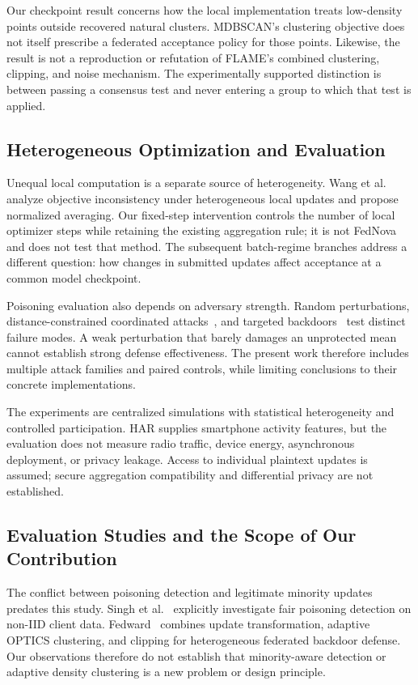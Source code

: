 \documentclass[journal]{IEEEtran}
\begin{document}
Our checkpoint result concerns how the local implementation treats low-density points outside recovered natural clusters. MDBSCAN's clustering objective does not itself prescribe a federated acceptance policy for those points. Likewise, the result is not a reproduction or refutation of FLAME's combined clustering, clipping, and noise mechanism. The experimentally supported distinction is between passing a consensus test and never entering a group to which that test is applied.

\subsection{Heterogeneous Optimization and Evaluation}
Unequal local computation is a separate source of heterogeneity. Wang et al.~\cite{wang2020fednova} analyze objective inconsistency under heterogeneous local updates and propose normalized averaging. Our fixed-step intervention controls the number of local optimizer steps while retaining the existing aggregation rule; it is not FedNova and does not test that method. The subsequent batch-regime branches address a different question: how changes in submitted updates affect acceptance at a common model checkpoint.

Poisoning evaluation also depends on adversary strength. Random perturbations, distance-constrained coordinated attacks~\cite{shejwalkar2021}, and targeted backdoors~\cite{bagdasaryan2020} test distinct failure modes. A weak perturbation that barely damages an unprotected mean cannot establish strong defense effectiveness. The present work therefore includes multiple attack families and paired controls, while limiting conclusions to their concrete implementations.

The experiments are centralized simulations with statistical heterogeneity and controlled participation. HAR supplies smartphone activity features, but the evaluation does not measure radio traffic, device energy, asynchronous deployment, or privacy leakage. Access to individual plaintext updates is assumed; secure aggregation compatibility and differential privacy are not established.

\subsection{Evaluation Studies and the Scope of Our Contribution}
The conflict between poisoning detection and legitimate minority updates predates this study. Singh et al.~\cite{singh2023fair} explicitly investigate fair poisoning detection on non-IID client data. Fedward~\cite{chen2023fedward} combines update transformation, adaptive OPTICS clustering, and clipping for heterogeneous federated backdoor defense. Our observations therefore do not establish that minority-aware detection or adaptive density clustering is a new problem or design principle.
\end{document}
